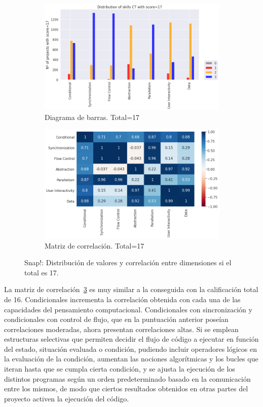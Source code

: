 \documentclass[a4paper, 12pt]{book}
\begin{document}
\begin{figure}[H]
    \centering
    \begin{subfigure}[h]{.49\textwidth} 
        \includegraphics[width=\textwidth]{img/distribucion_17_Snap}
        \caption{Diagrama de barras. Total=17}
        \label{fig:total17_Snap}
    \end{subfigure}       
    \begin{subfigure}[h]{.49\textwidth} 
        \includegraphics[width=\textwidth]{img/corr_17_Snap}
        \caption{Matriz de correlación. Total=17}
        \label{fig:corr17_Snap}
    \end{subfigure}
    \caption{Snap!: Distribución de valores y correlación entre dimensiones si el total es 17.}
\end{figure}

La matriz de correlación~\ref{fig:corr17_Snap} es muy similar a la conseguida con la calificación total de 16. Condicionales incrementa la correlación obtenida con cada una de las capacidades del pensamiento computacional. Condicionales con sincronización y condicionales con control de flujo, que en la puntuación anterior poseían correlaciones moderadas, ahora presentan correlaciones altas. Si se emplean estructuras selectivas que permiten decidir el flujo de código a ejecutar en función del estado, situación evaluada o condición, pudiendo incluir operadores lógicos en la evaluación de la condición, aumentan las nociones algorítmicas y los bucles que iteran hasta que se cumpla cierta condición, y se ajusta la ejecución de los distintos programas según un orden predeterminado basado en la comunicación entre los mismos, de modo que ciertos resultados obtenidos en otras partes del proyecto activen la ejecución del código.
\end{document}

